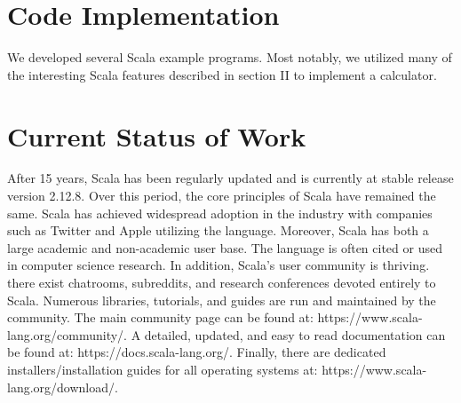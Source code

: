 \documentclass[jou,apacite]{IEEEtran}
\begin{document}
\section{Code Implementation}
We developed several Scala example programs. Most notably, we utilized many of the interesting Scala features described in section II to implement a calculator.

\section{Current Status of Work}
After 15 years, Scala has been regularly updated and is currently at stable release version 2.12.8. Over this period, the core principles of Scala have remained the same. Scala has achieved widespread adoption in the industry with companies such as Twitter and Apple utilizing the language. Moreover, Scala has both a large academic and non-academic user base. The language is often cited or used in computer science research. In addition, Scala's user community is thriving. there exist chatrooms, subreddits, and research conferences devoted entirely to Scala. Numerous libraries, tutorials, and guides are run and maintained by the community. The main community page can be found at: https://www.scala-lang.org/community/. A detailed, updated, and easy to read documentation can be found at: https://docs.scala-lang.org/. Finally, there are dedicated installers/installation guides for all operating systems at: https://www.scala-lang.org/download/.
\end{document}
